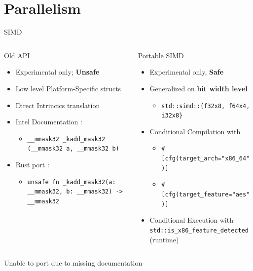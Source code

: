 \documentclass[compress,aspectratio=169]{beamer}
\begin{document}
\section{Parallelism}
\begin{frame}{SIMD}
  \begin{columns}
    \begin{column}{0.5\textwidth}
      \begin{block}{Old API}
        \begin{itemize}
          \item Experimental only; \textbf{Unsafe}
          \item Low level Platform-Specific structs
          \item Direct Intrincics translation
          \item Intel Documentation \cite{intel}:
            \begin{itemize}
              \item \texttt{\_\_mmask32 \_kadd\_mask32 (\_\_mmask32 a, \_\_mmask32 b)}
            \end{itemize}
          \item Rust port \cite{rustarch}:
            \begin{itemize}
              \item \texttt{unsafe fn \_kadd\_mask32(a: \_\_mmask32, b: \_\_mmask32) -> \_\_mmask32}
            \end{itemize}
        \end{itemize}
      \end{block}
    \end{column}
    \pause
    \begin{column}{0.5\textwidth}
      \begin{block}{Portable SIMD}
        \begin{itemize}
          \item Experimental only, \textbf{Safe}
          \item Generalized on \textbf{bit width level}
            \begin{itemize}
              \item \texttt{std::simd::\{f32x8, f64x4, i32x8\}}
            \end{itemize}
          \item Conditional Compilation \cite{concomp} with
            \begin{itemize}
              \item \texttt{\#[cfg(target\_arch="x86\_64")]}
              \item \texttt{\#[cfg(target\_feature="aes")]}
            \end{itemize}
          \item Conditional Execution \cite{isx86} with \texttt{std::is\_x86\_feature\_detected} (runtime)
        \end{itemize}
      \end{block}
    \end{column}
  \end{columns}
  \pause
  \begin{center}
    Unable to port due to missing documentation
  \end{center}
\end{frame}
\end{document}
